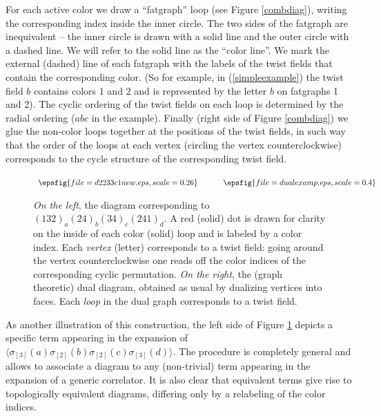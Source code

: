 \documentclass[letterpaper]{JHEP3}
\begin{document}
  
For each active color we draw a ``fatgraph'' loop (see Figure \ref{combdiag}), writing the corresponding index inside the inner circle.
The two sides of the fatgraph are inequivalent -- the inner circle is drawn with a solid line and the outer circle with a dashed line. We will refer to the solid line as the ``color line''.
We mark the external (dashed) line of each fatgraph with the  labels
of the twist fields that contain the corresponding color.
 (So for  example, in (\ref{simpleexample}) the twist field $b$ contains colors $1$ and $2$ and is represented by the letter $b$ 
 on  fatgraphs 1 and 2). The cyclic ordering of the twist fields on each loop  is determined by the radial 
 ordering  ($a  b  c$ in the example). Finally (right side of Figure \ref{combdiag})
we glue the non-color loops together at the positions of the twist fields, in such way that the order of the loops at each vertex (circling the vertex counterclockwise)
corresponds to the cycle structure of the corresponding twist field. 

\begin{figure}[htbp]
\begin{center}
$\begin{array}{c@{\hspace{0.45in}}c}
  \epsfig{file=d2233c1new.eps,scale=0.26}& \epsfig{file=dualexamp.eps,scale=0.4}  \\
\end{array}$
\end{center}
  \caption{{\it On the left}, the diagram corresponding to $(132)_a (24)_b (34)_c (241)_d$.
  A red (solid) dot is drawn for clarity on the inside of each color (solid) loop and is labeled by a  color index.
  Each {\it vertex} (letter) corresponds to a twist field: going around
  the vertex counterclockwise one reads off the color indices of
  the corresponding cyclic permutation.
{\it On the right},
the (graph theoretic) dual diagram, obtained as usual by dualizing  vertices into faces. 
Each {\it loop} in the dual graph corresponds to a twist field.} \label{okexample}
\end{figure}

As another illustration of this construction, the left side of Figure \ref{okexample} depicts
a specific term appearing in the expansion of $\langle \sigma_{[3]}(a) \sigma_{[2]}(b) \sigma_{[2]}(c) \sigma_{[3]}(d) \rangle$.
The procedure is completely general and allows to associate a diagram to any (non-trivial) term  appearing  in the expansion of a generic correlator. 
It is also clear that equivalent terms give rise to topologically equivalent diagrams, differing only by
a relabeling of the color indices. 
\end{document}
